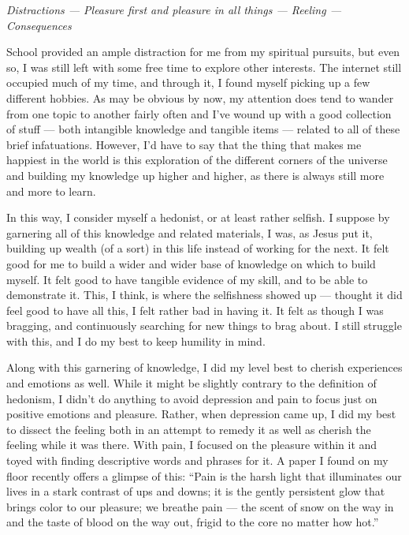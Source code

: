 \emph{Distractions --- Pleasure first and pleasure in all things --- Reeling --- Consequences}

School provided an ample distraction for me from my spiritual pursuits, but even so, I was still left with some free time to explore other interests. The internet still occupied much of my time, and through it, I found myself picking up a few different hobbies. As may be obvious by now, my attention does tend to wander from one topic to another fairly often and I've wound up with a good collection of stuff --- both intangible knowledge and tangible items --- related to all of these brief infatuations. However, I'd have to say that the thing that makes me happiest in the world is this exploration of the different corners of the universe and building my knowledge up higher and higher, as there is always still more and more to learn.

In this way, I consider myself a hedonist, or at least rather selfish. I suppose by garnering all of this knowledge and related materials, I was, as Jesus put it, building up wealth (of a sort) in this life instead of working for the next. It felt good for me to build a wider and wider base of knowledge on which to build myself. It felt good to have tangible evidence of my skill, and to be able to demonstrate it. This, I think, is where the selfishness showed up --- thought it did feel good to have all this, I felt rather bad in having it. It felt as though I was bragging, and continuously searching for new things to brag about. I still struggle with this, and I do my best to keep humility in mind.

Along with this garnering of knowledge, I did my level best to cherish experiences and emotions as well. While it might be slightly contrary to the definition of hedonism, I didn't do anything to avoid depression and pain to focus just on positive emotions and pleasure. Rather, when depression came up, I did my best to dissect the feeling both in an attempt to remedy it as well as cherish the feeling while it was there. With pain, I focused on the pleasure within it and toyed with finding descriptive words and phrases for it. A paper I found on my floor recently offers a glimpse of this: ``Pain is the harsh light that illuminates our lives in a stark contrast of ups and downs; it is the gently persistent glow that brings color to our pleasure; we breathe pain --- the scent of snow on the way in and the taste of blood on the way out, frigid to the core no matter how hot.''

